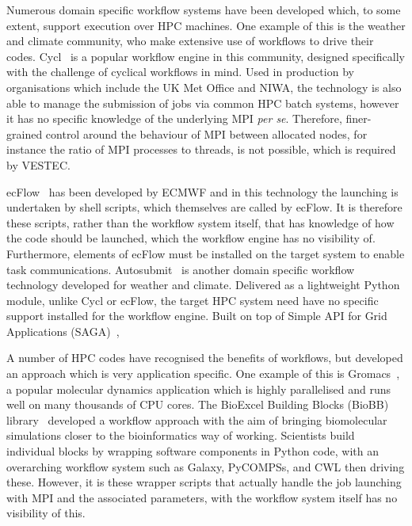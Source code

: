 \documentclass[conference]{IEEEtran}
\begin{document}
Numerous domain specific workflow systems have been developed which, to some extent, support execution over HPC machines. One example of this is the weather and climate community, who make extensive use of workflows to drive their codes. Cycl~\cite{Cylc:2019} is a popular workflow engine in this community, designed specifically with the challenge of cyclical workflows in mind. Used in production by organisations which include the UK Met Office and NIWA, the technology is also able to manage the submission of jobs via common HPC batch systems, however it has no specific knowledge of the underlying MPI \emph{per se}. Therefore, finer-grained control around the behaviour of MPI between allocated nodes, for instance the ratio of MPI processes to threads, is not possible, which is required by VESTEC.

ecFlow~\cite{bahra2011managing} has been developed by ECMWF and in this technology the launching is undertaken by shell scripts, which themselves are called by ecFlow. It is therefore these scripts, rather than the workflow system itself, that has knowledge of how the code should be launched, which the workflow engine has no visibility of. Furthermore, elements of ecFlow must be installed on the target system to enable task communications. Autosubmit~\cite{manubens2016seamless} is another domain specific workflow technology developed for weather and climate. Delivered as a lightweight Python module, unlike Cycl or ecFlow, the target HPC system need have no specific support installed for the workflow engine. Built on top of Simple API for Grid Applications (SAGA)~\cite{goodale2006saga}, 

A number of HPC codes have recognised the benefits of workflows, but developed an approach which is very application specific. One example of this is Gromacs~\cite{javanainen2017atomistic}, a popular molecular dynamics application which is highly parallelised and runs well on  many thousands of CPU cores. The BioExcel Building Blocks (BioBB) library~\cite{andrio2019bioexcel} developed a workflow approach with the aim of bringing biomolecular simulations closer to the bioinformatics way of working. Scientists build individual blocks by wrapping software components in Python code, with an overarching workflow system such as Galaxy, PyCOMPSs, and CWL then driving these. However, it is these wrapper scripts that actually handle the job launching with MPI and the associated parameters, with the workflow system itself has no visibility of this.
\end{document}
